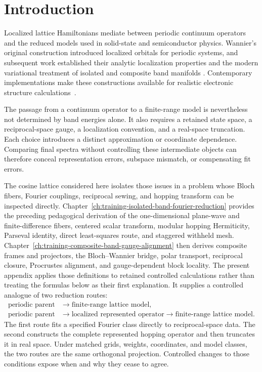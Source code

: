 \section{Introduction}

Localized lattice Hamiltonians mediate between periodic continuum operators and
the reduced models used in solid-state and semiconductor physics. Wannier's
original construction introduced localized orbitals for periodic systems, and
subsequent work established their analytic localization properties and the
modern variational treatment of isolated and composite band manifolds
\cite{wannier1937,kohn1959,marzari1997,souza2001,marzari2012}. Contemporary
implementations make these constructions available for realistic electronic
structure calculations~\cite{pizzi2020}.

The passage from a continuum operator to a finite-range model is nevertheless
not determined by band energies alone. It also requires a retained state space,
a reciprocal-space gauge, a localization convention, and a real-space
truncation. Each choice introduces a distinct approximation or coordinate
dependence. Comparing final spectra without controlling these intermediate
objects can therefore conceal representation errors, subspace mismatch, or
compensating fit errors.

The cosine lattice considered here isolates those issues in a problem whose
Bloch fibers, Fourier couplings, reciprocal sewing, and hopping transform can be
inspected directly. Chapter~\ref{ch:training-isolated-band-fourier-reduction}
provides the preceding pedagogical derivation of the one-dimensional
plane-wave and finite-difference fibers, centered scalar transform, modular
hopping Hermiticity, Parseval identity, direct least-squares route, and
staggered withheld mesh. Chapter~\ref{ch:training-composite-band-gauge-alignment}
then derives composite frames and projectors, the Bloch--Wannier bridge, polar
transport, reciprocal closure, Procrustes alignment, and gauge-dependent block
locality. The present appendix applies those definitions to retained controlled
calculations rather than treating the formulas below as their first
explanation. It supplies a controlled analogue of two reduction routes:
\begin{align}
    \text{periodic parent}
    &\longrightarrow
    \text{finite-range lattice model},
    \label{eq:periodic-1d-direct-route}
    \\
    \text{periodic parent}
    &\longrightarrow
    \text{localized represented operator}
    \longrightarrow
    \text{finite-range lattice model}.
    \label{eq:periodic-1d-mediated-route}
\end{align}
The first route fits a specified Fourier class directly to reciprocal-space
data. The second constructs the complete represented hopping operator and then
truncates it in real space. Under matched grids, weights, coordinates, and model
classes, the two routes are the same orthogonal projection. Controlled changes
to those conditions expose when and why they cease to agree.

